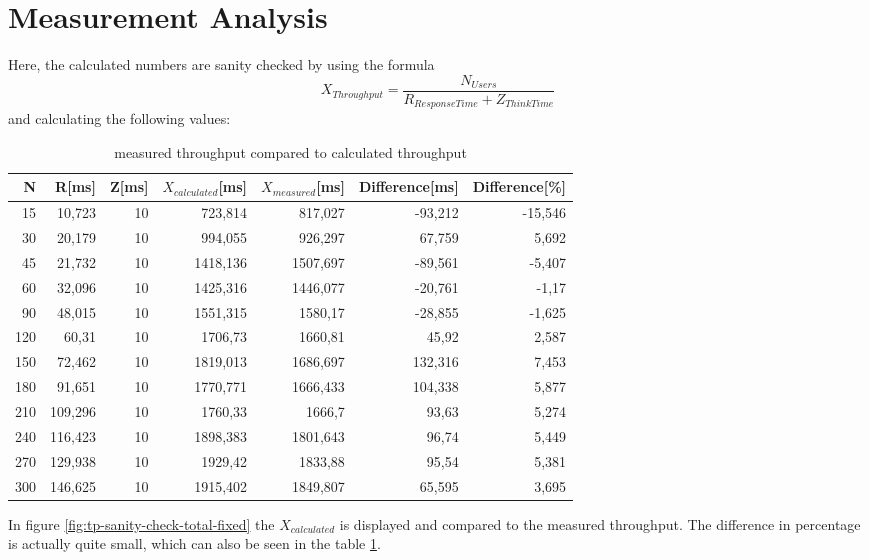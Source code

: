 \documentclass[a4paper]{article}
\begin{document}
\pagebreak

\section{Measurement Analysis}
\label{sec:measurement-analysis}

Here, the calculated numbers are sanity checked by using the formula $$X_{Throughput}=\frac{N_{Users}}{R_{ResponseTime} + Z_{ThinkTime}}$$ and calculating the following values:

\begin{table}[h!]
\begin{center}
\begin{tabular}{|r|r|r|r|r|r|r|}
\hline
\textbf{N} & \textbf{R[ms]} & \textbf{Z[ms]} & \textbf{$X_{calculated}$[ms]} & \textbf{$X_{measured}$[ms]} & \textbf{Difference[ms]} & \textbf{Difference[\%]} \\ \hline
15  & 10,723 & 10 & 723,814  & 817,027 & -93,212 & -15,546 \\ \hline
30  & 20,179 & 10 & 994,055  & 926,297 & 67,759  & 5,692   \\ \hline
45  & 21,732 & 10 & 1418,136  & 1507,697 & -89,561 & -5,407 \\ \hline
60  & 32,096 & 10 & 1425,316  & 1446,077 & -20,761 & -1,17 \\ \hline
90  & 48,015 & 10 & 1551,315  & 1580,17     & -28,855 & -1,625 \\ \hline
120 & 60,31 & 10 & 1706,73  & 1660,81     & 45,92  & 2,587  \\ \hline
150 & 72,462 & 10 & 1819,013  & 1686,697 & 132,316  & 7,453  \\ \hline
180 & 91,651 & 10 & 1770,771  & 1666,433 & 104,338  & 5,877   \\ \hline
210 & 109,296 & 10 & 1760,33   & 1666,7      & 93,63  & 5,274  \\ \hline
240 & 116,423 & 10 & 1898,383  & 1801,643 & 96,74  & 5,449  \\ \hline
270 & 129,938  & 10 & 1929,42   & 1833,88     & 95,54  & 5,381  \\ \hline
300 & 146,625 & 10 & 1915,402  & 1849,807 & 65,595  & 3,695  \\ \hline
\end{tabular}
\caption{measured throughput compared to calculated throughput}
\label{tab:sanity-check}
\end{center}
\end{table}

In figure \ref{fig:tp-sanity-check-total-fixed} the $X_{calculated}$ is displayed and compared to the measured throughput. The difference in percentage is actually quite small, which can also be seen in the table \ref{tab:sanity-check}.\\
\end{document}
